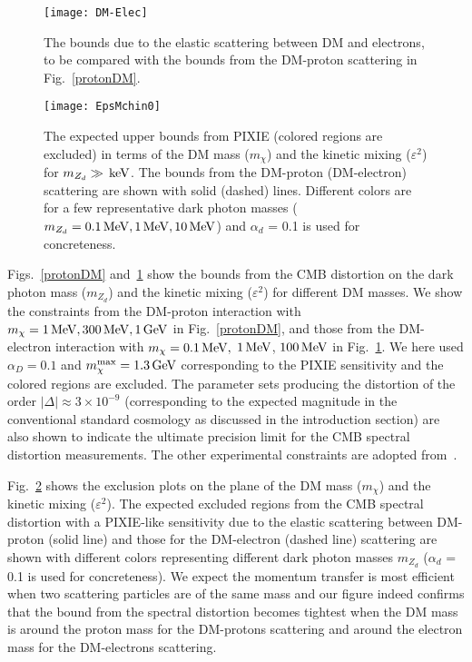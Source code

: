 \documentclass[5p,times]{elsarticle}
\newcommand{\cred}[1]{{\color{red}{#1}}}
\newcommand\gev{\,{\rm GeV}}
\newcommand\mev{\,{\rm MeV}}
\newcommand\kev{\,{\rm keV}}
\begin{document}
\begin{figure} [t!]
\centering
\texttt{[image: DM-Elec]}
\caption{The bounds due to the elastic scattering between DM and electrons, to be compared with the bounds from the DM-proton scattering in Fig.~\ref{protonDM}. 
}
 \label{electronDM}
\end{figure}




\begin{figure}[!]
\centering
\texttt{[image: EpsMchin0]}
\caption{The expected upper bounds from PIXIE (colored regions are excluded) in terms of the DM mass ($m_\chi$) and the kinetic mixing ($\varepsilon^2$) for $m_{Z_d}\gg \kev$. The bounds from the DM-proton (DM-electron) scattering are shown with solid (dashed) lines. Different colors are for a few representative dark photon masses ($m_{Z_d}=0.1 \mev,1 \mev, 10 \mev$) and $\alpha_d$ = 0.1 is used for concreteness.}
\label{fig:EpsMchiPro}
\end{figure}

Figs.~\ref{protonDM} and~\ref{electronDM} show the bounds from the CMB distortion on the dark photon mass ($m_{Z_d}$) and the kinetic mixing ($\varepsilon^2$) for different DM masses.
We show the constraints from the DM-proton interaction with $m_\chi=1\mev,300\mev,1\gev$ in Fig.~\ref{protonDM}, and those from the DM-electron interaction with $m_\chi=0.1\mev,$ $1\mev$,   $100\mev$ in Fig.~\ref{electronDM}.
   We here used $\alpha_D=0.1$ and $m_\chi^{\rm max}=1.3 \gev$ corresponding to the PIXIE sensitivity and the colored regions are excluded. The parameter sets producing the distortion of the order $|\Delta|\approx 3 \times 10^{-9}$ (corresponding to the expected magnitude in the conventional standard cosmology as discussed in the introduction section) are also shown to indicate the ultimate precision limit for the CMB spectral distortion measurements.  The other experimental constraints are adopted from~\cite{Alekhin:2015byh}.
 
 

Fig.~\ref{fig:EpsMchiPro} shows the exclusion plots on the plane of the DM mass ($m_\chi$) and the kinetic mixing ($\varepsilon^2$). The expected excluded regions from the CMB spectral distortion with a PIXIE-like sensitivity due to the elastic scattering between DM-proton (solid line) and those for the DM-electron (dashed line) scattering are shown with different colors representing different dark photon masses $m_{Z_d}$ ($\alpha_d$ = 0.1 is used for concreteness). We expect the momentum transfer is most efficient when two scattering particles are of the same mass and our figure indeed confirms that the bound from the spectral distortion becomes tightest when the DM mass is around the proton mass for the DM-protons scattering and around the electron mass for the DM-electrons scattering. 
\end{document}
